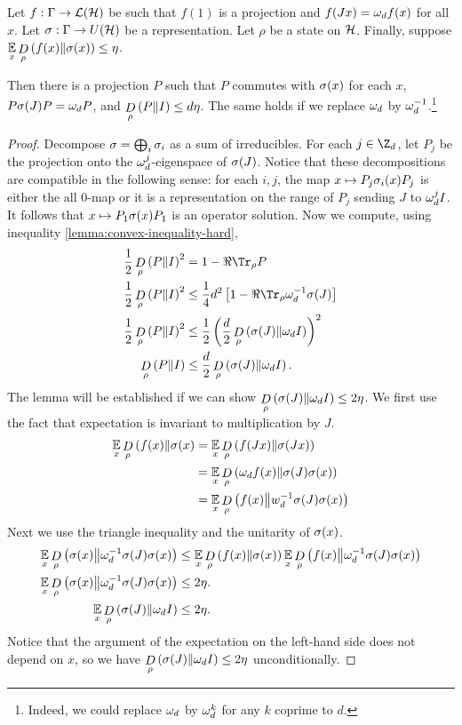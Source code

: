 \begin{lemma}
\label{lemma:fixing-the-J}
	Let $f:\Gamma\to \mathcal L(\mathcal H)$ be such that $f(1)$ is a projection and $f(Jx) = \omega_df(x)$ for all $x$. 
	Let $\sigma: \Gamma \to U(\mathcal H)$ be a representation. Let $\rho$ be a state on $\mathcal H$. Finally, suppose $\operatorname*{\mathbb E}\limits_{x}\mathop{D}\limits_{\rho}\left(f(x)\middle\| \sigma(x)\right) \leq \eta$. 

	Then there is a projection $P$ such 
	that $P$ commutes with $\sigma(x)$ for each $x$, $P\sigma(J)P = \omega_dP$, and $\mathop{D}\limits_{\rho}\left(P\middle\| I\right) \leq d \eta$. The same holds if we replace $\omega_d$ by $\omega_d^{-1}$.\footnote{Indeed, we could replace $\omega_d$ by $\omega_d^k$ for any $k$ coprime to $d$.}
\end{lemma}
\begin{proof}
	Decompose $\sigma = \bigoplus_i \sigma_i$ as a sum of irreducibles. 
	For each $j \in \Z_d$, let $P_j$ be the projection onto the $\omega_d^j$-eigenspace of $\sigma(J)$.
	Notice that these decompositions are compatible in the following sense: for each $i,j$, the map $x\mapsto P_j\sigma_i(x)P_j$ is either the all $0$-map or it is a representation on the range of $P_j$ sending $J$ to $\omega_d^jI$. It follows that $x\mapsto P_1 \sigma(x)P_1$ is an operator solution. Now we compute, using inequality \ref{lemma:convex-inequality-hard},
	\begin{align}
	\frac12\drho\rho PI^2 
	&= 1 - \Re\Tr_\rho P
	\\
	\frac12\drho\rho PI^2
	&\leq \frac14d^2\left[
		1 - \Re\Tr_\rho\w_d\1\s(J)
	\right]
	\\
	\frac12\drho\rho PI^2
	&\leq \frac12\left(\frac d2\drho\rho{\s(J)}{\w_dI}\right)^2
	\\
	\drho\rho PI
	&\leq \frac d2\drho\rho{\s(J)}{\w_dI}.
	\end{align}
	The lemma will be established if we can show $\mathop{D}\limits_{\rho}\left(\sigma(J)\middle\| \omega_dI\right) \leq 2 \eta$. We first use the fact that expectation is invariant to multiplication by $J$.
	\begin{align}
		\operatorname*{\mathbb E}\limits_{x}\mathop{D}\limits_{\rho}\left(f(x)\middle\| \sigma(x\right)
		&=\operatorname*{\mathbb E}\limits_{x}\mathop{D}\limits_{\rho}\left(f(Jx)\middle\| \sigma(Jx)\right)
		\\&=
		\operatorname*{\mathbb E}\limits_{x}\mathop{D}\limits_{\rho}\left(\omega_df(x)\middle\| \sigma(J)\sigma(x)\right)
		\\&=
		\operatorname*{\mathbb E}\limits_{x}\mathop{D}\limits_{\rho}\left(f(x)\middle\| w_d^{-1}\sigma(J)\sigma(x)\right)
	\end{align}
	Next we use the triangle inequality and the unitarity of $\sigma(x)$. 
	\begin{align}
		\operatorname*{\mathbb E}\limits_{x}\mathop{D}\limits_{\rho}\left(\sigma(x)\middle\| \omega_d^{-1}\sigma(J)\sigma(x)\right)
		&\leq 
		\operatorname*{\mathbb E}\limits_{x}\mathop{D}\limits_{\rho}\left(f(x)\middle\| \sigma(x)\right)
		\operatorname*{\mathbb E}\limits_{x}\mathop{D}\limits_{\rho}\left(f(x)\middle\| \omega_d^{-1}\sigma(J)\sigma(x)\right)
		\\
		\operatorname*{\mathbb E}\limits_{x}\mathop{D}\limits_{\rho}\left(\sigma(x)\middle\| \omega_d^{-1}\sigma(J)\sigma(x)\right)
		&\leq2\eta. 
		\\
		\operatorname*{\mathbb E}\limits_{x}\mathop{D}\limits_{\rho}\left(\sigma(J)\middle\| \omega_dI\right)
		&\leq2\eta. 
	\end{align}
	Notice that the argument of the expectation on the left-hand side does not depend on $x$, so we have 
	\mbox{$\mathop{D}\limits_{\rho}\left(\sigma(J)\middle\| \omega_dI\right) \leq 2\eta$} unconditionally.
\end{proof}




